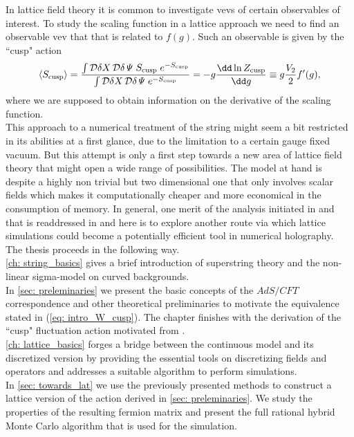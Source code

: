 %
%
In lattice field theory it is common to investigate vevs of certain observables of interest. To study the scaling function in a lattice approach we need to find an observable vev that that is related to $f(g)$. Such an observable is given by the ``cusp" action
%
%
\begin{equation}
\langle S_{\rm cusp} \rangle = \frac{\int \mathcal{D}\delta X\,\mathcal{D}\delta\mathit{\Psi} \; S_{\rm cusp} \;e^{-S_{\rm cusp}}}{\int \mathcal{D}\delta X\,\mathcal{D}\delta\mathit{\Psi} \; e^{-S_{\rm cusp}}} = -g \frac{\dd \ln Z_{\rm cusp}}{\dd g} \equiv g\frac{V_{2}}{2} f'(g),
\end{equation}
%
%
where we are supposed to obtain information on the derivative of the scaling function.\\
This approach to a numerical treatment of the  string might seem a bit restricted in its abilities at a first glance, due to the limitation to a certain gauge fixed vacuum. But this attempt is only a first step towards a new area of lattice field theory that might open a wide range of possibilities. The model at hand is despite a highly non trivial but two dimensional one that only involves scalar fields which makes it computationally cheaper and more economical in the consumption of memory. In general, one merit of the analysis initiated in \cite{Roiban} and that is readdressed in \cite{Bianchi:2016cyv,Forini:2016sot} and here is to explore another route via which lattice simulations  could become a potentially efficient tool in numerical holography.\\[0.5cm]
%
%
The thesis proceeds in the following way.\\
%
\autoref{ch: string_basics} gives a brief introduction of superstring theory and the non-linear sigma-model on curved backgrounds.\\
%
In \autoref{sec: preleminaries} we present the basic concepts of the $AdS/CFT$ correspondence and other theoretical preliminaries to motivate the equivalence stated in (\ref{eq: intro_W_cusp}). The chapter finishes with the derivation of the ``cusp" fluctuation action motivated from \cite{Metsaev:2000yu,Metsaev:2000yf,Giombi:2009gd}.\\
%
\autoref{ch: lattice_basics} forges a bridge between the continuous model and its discretized version by providing the essential tools on discretizing fields and operators and addresses a suitable algorithm to perform simulations.\\
%
In \autoref{sec: towards_lat} we use the previously presented methods to construct a lattice version of the action derived in \autoref{sec: preleminaries}. We study the properties of the resulting fermion matrix and present the full rational hybrid Monte Carlo algorithm that is used for the simulation.\\
